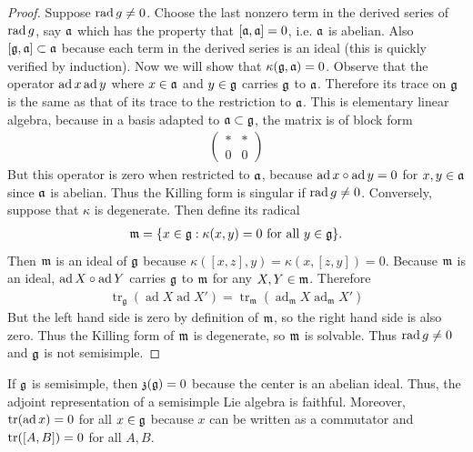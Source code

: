 \documentclass[12pt]{article}
\begin{document}
\begin{proof}
    Suppose $\operatorname{rad} g \neq 0$. Choose the last nonzero term in the derived series of $\operatorname{rad} g$, say $\mathfrak{a}$ which has the property that $[\mathfrak{a}, \mathfrak{a}] = 0$, i.e. $\mathfrak{a}$ is abelian. Also $[\mathfrak{g}, \mathfrak{a}] \subset \mathfrak{a}$ because each term in the derived series is an ideal (this is quickly verified by induction). Now we will show that $\kappa(\mathfrak{g}, \mathfrak{a}) = 0$. Observe that the operator $\operatorname{ad} x \operatorname{ad} y$ where $x\in \mathfrak{a}$ and $y\in \mathfrak{g}$ carries $\mathfrak{g}$ to $\mathfrak{a}$. Therefore its trace on $\mathfrak{g}$ is the same as that of its trace to the restriction to $\mathfrak{a}$. This is elementary linear algebra, because in a basis adapted to $\mathfrak{a} \subset \mathfrak{g}$, the matrix is of block form \begin{align*}
        \begin{pmatrix}
            * & * \\
            0 & 0
        \end{pmatrix}
    \end{align*} But this operator is zero when restricted to $\mathfrak{a}$, because $\operatorname{ad} x\circ \operatorname{ad} y = 0$ for $x,y\in \mathfrak{a}$ since $\mathfrak{a}$ is abelian. Thus the Killing form is singular if $\operatorname{rad} g \neq 0$. Conversely, suppose that $\kappa$ is degenerate. Then define its radical \begin{align*}
        \mathfrak{m} = \{x\in \mathfrak{g} : \kappa(x,y) = 0 \text{ for all } y\in \mathfrak{g}\}.
    \end{align*} Then $\mathfrak{m}$ is an ideal of $\mathfrak{g}$ because $\kappa([x,z],y) = \kappa(x,[z,y]) = 0$. Because $\mathfrak{m}$ is an ideal, $\operatorname{ad} X \circ \operatorname{ad} Y$ carries $\mathfrak{g}$ to $\mathfrak{m}$ for any $X,Y\in \mathfrak{m}$. Therefore \begin{align*}
        \operatorname{tr}_{\mathfrak g}(\operatorname{ad}X\operatorname{ad}X')
        =
        \operatorname{tr}_{\mathfrak m}(\operatorname{ad}_{\mathfrak m}X\operatorname{ad}_{\mathfrak m}X')
    \end{align*} But the left hand side is zero by definition of $\mathfrak{m}$, so the right hand side is also zero. Thus the Killing form of $\mathfrak{m}$ is degenerate, so $\mathfrak{m}$ is solvable. Thus $\operatorname{rad} g \neq 0$ and $\mathfrak{g}$ is not semisimple. \qedhere
\end{proof}

If $\mathfrak{g}$ is semisimple, then $\mathfrak{z}(\mathfrak{g}) = 0$ because the center is an abelian ideal. Thus, the adjoint representation of a semisimple Lie algebra is faithful. Moreover, $\operatorname{tr}(\operatorname{ad} x) = 0$ for all $x \in \mathfrak{g}$ because $x$ can be written as a commutator and $\operatorname{tr}([A,B]) = 0$ for all $A,B$.
\end{document}
